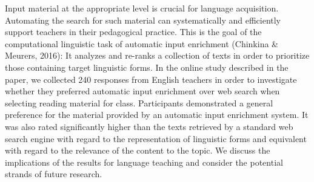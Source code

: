 Input material at the appropriate level is crucial for language acquisition. Automating the search for such material can systematically and efficiently support teachers in their pedagogical practice. This is the goal of the computational linguistic task of automatic input enrichment (Chinkina \& Meurers, 2016): It analyzes and re-ranks a collection of texts in order to prioritize those containing target linguistic forms. In the online study described in the paper, we collected 240 responses from English teachers in order to investigate whether they preferred automatic input enrichment over web search when selecting reading material for class. Participants demonstrated a general preference for the material provided by an automatic input enrichment system. It was also rated significantly higher than the texts retrieved by a standard web search engine with regard to the representation of linguistic forms and equivalent with regard to the relevance of the content to the topic. We discuss the implications of the results for language teaching and consider the potential strands of future research.
